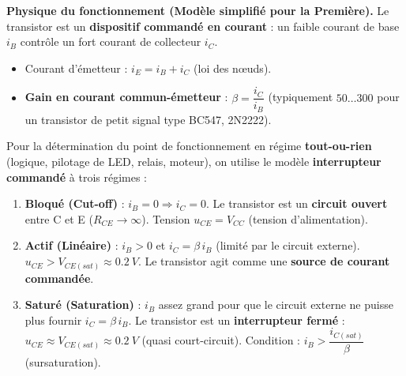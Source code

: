 \documentclass[11pt]{article}
\begin{document}
\noindent\textbf{Physique du fonctionnement (Modèle simplifié pour la Première).}
Le transistor est un \textbf{dispositif commandé en courant} : un faible courant de base $i_B$ contrôle un fort courant de collecteur $i_C$.
\begin{itemize}
\item Courant d'émetteur : $i_E = i_B + i_C$ (loi des nœuds).
\item \textbf{Gain en courant commun-émetteur} : $\beta = \dfrac{i_C}{i_B}$ (typiquement $50 \dots 300$ pour un transistor de petit signal type BC547, 2N2222).
\end{itemize}

\begin{propriete}
Pour la détermination du point de fonctionnement en régime \textbf{tout-ou-rien} (logique, pilotage de LED, relais, moteur), on utilise le modèle \textbf{interrupteur commandé} à trois régimes :
\begin{enumerate}
\item \textbf{Bloqué (Cut-off)} : $i_B = 0 \Rightarrow i_C = 0$. Le transistor est un \textbf{circuit ouvert} entre C et E ($R_{CE} \to \infty$). Tension $u_{CE} = V_{CC}$ (tension d'alimentation).
\item \textbf{Actif (Linéaire)} : $i_B > 0$ et $i_C = \beta\,i_B$ (limité par le circuit externe). $u_{CE} > V_{CE(sat)} \approx \SI{0,2}{V}$. Le transistor agit comme une \textbf{source de courant commandée}.
\item \textbf{Saturé (Saturation)} : $i_B$ assez grand pour que le circuit externe ne puisse plus fournir $i_C = \beta\,i_B$. Le transistor est un \textbf{interrupteur fermé} : $u_{CE} \approx V_{CE(sat)} \approx \SI{0,2}{V}$ (quasi court-circuit). Condition : $i_B > \dfrac{i_{C(sat)}}{\beta}$ (sursaturation).
\end{enumerate}
\end{propriete}
\end{document}
